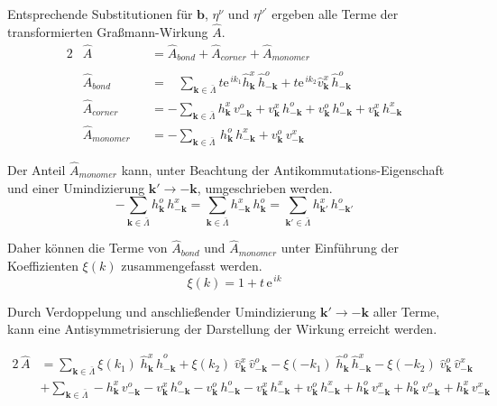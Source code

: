 \noindent Entsprechende Substitutionen für $\bm{b}$, $\eta^{\nu}$ und $\eta^{\nu'}$ ergeben alle Terme der transformierten Graßmann-Wirkung $\hat{A}$.
\begin{alignat}{2}
        & \hat{A}   &&= \hat{A}_{bond} + \hat{A}_{corner} + \hat{A}_{monomer} \nonumber \\
        \nonumber \\
        &\hat{A}_{bond} &&= \;\;\; \sum_{\bm{k} \in \bar{\Lambda}}  
            t \mathrm{e}^{\,i k_1} \hat{h}_{\bm{k}}^{x} \, \hat{h}_{-\bm{k}}^{o} 
            + t \mathrm{e}^{\,i k_2} \hat{v}_{\bm{k}}^{x} \, \hat{h}_{-\bm{k}}^{o}  \nonumber\\
       & \hat{A}_{corner} &&= -\sum_{\bm{k} \in \bar{\Lambda}} 
            h_{\bm{k}}^x \,v_{-\bm{k}}^o 
            + v_{\bm{k}}^x\, h_{-\bm{k}}^o
            + v_{\bm{k}}^o \,h_{-\bm{k}}^o 
            + v_{\bm{k}}^x \,h_{-\bm{k}}^x \nonumber\\
       &  \hat{A}_{monomer}&&= -\sum_{\bm{k} \in \bar{\Lambda}} 
            \, h_{\bm{k}}^o \,h_{-\bm{k}}^x
            +  v_{\bm{k}}^o \,v_{-\bm{k}}^x \nonumber
\end{alignat}

\noindent Der Anteil $\hat{A}_{monomer}$ kann, unter Beachtung der Antikommutations-Eigenschaft und einer Umindizierung $\bm{k'} \rightarrow -\bm{k}$, umgeschrieben werden.
\begin{equation}
-\sum_{\bm{k} \in \bar{\Lambda}} h_{\bm{k}}^o \,h_{-\bm{k}}^x = \sum_{\bm{k} \in \bar{\Lambda}} h_{-\bm{k}}^x \, h_{\bm{k}}^o  = 
\sum_{\bm{k'} \in \bar{\Lambda}} h_{\bm{k'}}^x \, h_{-\bm{k'}}^o  
\end{equation}

\noindent Daher können die Terme von $\hat{A}_{bond}$ und $\hat{A}_{monomer}$ unter Einführung der Koeffizienten $\xi(k)$ zusammengefasst werden. 
\begin{equation} 
\xi(k) = 1 + t\,\mathrm{e}^{\,ik} 
\end{equation}

\noindent Durch Verdoppelung und anschließender Umindizierung $\bm{k'} \rightarrow -\bm{k}$ aller Terme, kann eine Antisymmetrisierung der Darstellung der Wirkung erreicht werden.

\begin{align}
    2\,\hat{A}  
        &= \sum_{\bm{k} \in \bar{\Lambda}}  
        \xi(k_1) \; \hat{h}_{\bm{k}}^{x} \,\hat{h}_{-\bm{k}}^{o} 
        + \xi(k_2) \; \hat{v}_{\bm{k}}^{x} \,\hat{v}_{-\bm{k}}^{o}  
        - \xi(-k_1) \;  \hat{h}_{\bm{k}}^{o} \,\hat{h}_{-\bm{k}}^{x}
        - \xi(-k_2) \; \hat{v}_{\bm{k}}^{o} \,\hat{v}_{-\bm{k}}^{x}   \nonumber\\
        & + \sum_{\bm{k} \in \bar{\Lambda}}  
        - h_{\bm{k}}^x \,v_{-\bm{k}}^o 
        - v_{\bm{k}}^x\, h_{-\bm{k}}^o
        - v_{\bm{k}}^o \,h_{-\bm{k}}^o 
        - v_{\bm{k}}^x \,h_{-\bm{k}}^x 
        + v_{\bm{k}}^o \, h_{-\bm{k}}^x  
        + h_{\bm{k}}^o \, v_{-\bm{k}}^x
        + h_{\bm{k}}^o \, v_{-\bm{k}}^o 
        + h_{\bm{k}}^x \, v_{-\bm{k}}^x  \nonumber 
\end{align}

